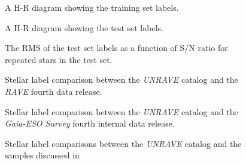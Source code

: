 \documentclass[preprint2,trackchanges]{aastex}
\newcommand{\project}[1]{\textsl{#1}}
\begin{document}
\clearpage

\begin{figure}[p]
\caption{A H-R diagram showing the training set labels.\label{fig:training-set-hrd}}
\end{figure}

\begin{figure}[p]
\caption{A H-R diagram showing the test set labels.\label{fig:test-set-hrd}}
\end{figure}

\begin{figure}[p]
\caption{The RMS of the test set labels as a function of S/N ratio for repeated stars in the test set.\label{fig:test-set-repeats}}
\end{figure}

\begin{figure}[p]
\caption{Stellar label comparison between the \project{UNRAVE} catalog and the \project{RAVE} fourth data release.\label{fig:dr4-comparison}}
\end{figure}

\begin{figure}[p]
\caption{Stellar label comparison between the \project{UNRAVE} catalog and the \project{Gaia-ESO Survey} fourth internal data release.\label{fig:dr4-comparison}}
\end{figure}

\begin{figure}[p]
\caption{Stellar label comparisons between the \project{UNRAVE} catalog and the samples discussed in \citep{kordopatis_2014}}
\end{figure}
\end{document}
